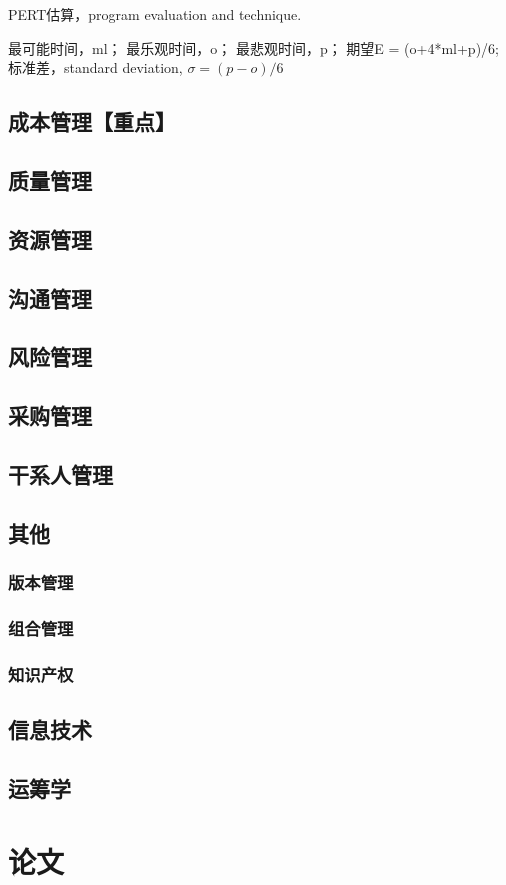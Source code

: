 \documentclass[UTF8]{../computerUniverse}
\begin{document}
PERT估算，program evaluation and technique.

最可能时间，ml；
最乐观时间，o；
最悲观时间，p；
期望E = (o+4*ml+p)/6;
标准差，standard deviation, $\sigma = (p-o)/6$

\section{成本管理【重点】}

\section{质量管理}

\section{资源管理}

\section{沟通管理}



\section{风险管理}

\section{采购管理}

\section{干系人管理}

\section{其他}
\subsection{版本管理}
\subsection{组合管理}
\subsection{知识产权}


\section{信息技术}

\section{运筹学}


\chapter{论文}
\end{document}
